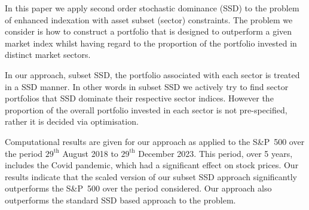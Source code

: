 In this paper we apply second order stochastic dominance (SSD) to the problem of enhanced indexation with asset subset (sector) constraints. The problem we
 consider is how to construct a portfolio that is
designed to outperform a given market index whilst having regard to the proportion of the portfolio invested in distinct market sectors. 

In our approach, subset SSD,  the portfolio associated with each sector is treated in a SSD manner. 
In other words in subset SSD we actively try to find sector portfolios that SSD dominate their respective sector indices.
However the proportion of the overall portfolio 
invested in each sector is not pre-specified, rather it is decided via optimisation.

Computational results are given for our approach as applied to the S\&P~500 over the period 
$29^{\text{th}}$ August 2018 to $29^{\text{th}}$ December 2023. This period, over 5 years, includes the Covid pandemic, 
which had a significant effect on stock prices.
Our results indicate that the scaled version of our subset SSD
approach significantly outperforms the S\&P~500 over the period considered. Our approach also outperforms the standard SSD based
approach to the problem.